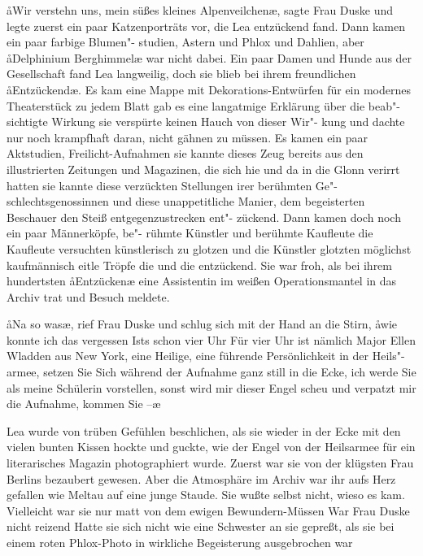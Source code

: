 \aa{}Wir verstehn uns, mein süßes kleines Alpenveilchen\ae{}, sagte
Frau Duske und legte zuerst ein paar Katzenporträts vor, die
Lea entzückend fand. Dann kamen ein paar farbige Blumen"-%
studien, Astern und Phlox und Dahlien, aber \aa{}Delphinium
Berghimmel\ae{} war nicht dabei. Ein paar Damen und Hunde
aus der Gesellschaft fand Lea langweilig, doch sie blieb bei
ihrem freundlichen \aa{}Entzückend\ae{}. Es kam eine Mappe mit
Dekorations-Entwürfen für ein modernes Theaterstück\semi{} zu
jedem Blatt gab es eine langatmige Erklärung über die beab"-%
sichtigte Wirkung\semi{} sie verspürte keinen Hauch von dieser Wir"-%
kung und dachte nur noch krampfhaft daran, nicht gähnen zu
müssen. Es kamen ein paar Aktstudien, Freilicht-Aufnahmen\semi{}
sie kannte dieses Zeug bereits aus den illustrierten Zeitungen
und Magazinen, die sich hie und da in die Glonn verirrt hatten\semi{}
sie kannte diese verzückten Stellungen irer berühmten Ge"-%
schlechtsgenossinnen und diese unappetitliche Manier, dem
begeisterten Beschauer den Steiß entgegenzustrecken\dopp{} ent"-%
zückend. Dann kamen doch noch ein paar Männerköpfe, be"-%
rühmte Künstler und berühmte Kaufleute\semi{} die Kaufleute
versuchten künstlerisch zu glotzen und die Künstler glotzten
möglichst kaufmännisch\semi{} eitle Tröpfe die und die\dopp{} entzückend.
Sie war froh, als bei ihrem hundertsten \aa{}Entzücken\ae{} eine
Assistentin im weißen Operationsmantel in das Archiv trat
und Besuch meldete.

\aa{}Na so was\ae{}, rief Frau Duske und schlug sich mit der Hand an
die Stirn, \aa{}wie konnte ich das vergessen\ausr{} Ists schon vier Uhr\frag{}
Für vier Uhr ist nämlich Major Ellen Wladden aus New
York, eine Heilige, eine führende Persönlichkeit in der Heils"-%
armee, setzen Sie Sich\eingriff{eS62-1}{Sich ] sich} während der Aufnahme ganz still in die
Ecke, ich werde Sie als meine Schülerin vorstellen, sonst
wird mir dieser Engel scheu und verpatzt mir die Aufnahme,
kommen Sie --\ae{}

Lea wurde von trüben Gefühlen beschlichen, als sie wieder
in der Ecke mit den vielen bunten Kissen hockte und guckte,
wie der Engel von der Heilsarmee für ein literarisches Magazin
photographiert wurde. Zuerst war sie von der klügsten Frau
Berlins bezaubert gewesen. Aber die Atmosphäre im Archiv
war ihr aufs Herz gefallen wie Meltau\label{lS63-1} auf eine junge Staude.
Sie wußte selbst nicht, wieso es kam. Vielleicht war sie nur
matt von dem ewigen Bewundern-Müssen\frag{} War Frau Duske
nicht reizend\frag{} Hatte sie sich nicht wie eine Schwester an sie
gepreßt, als sie bei einem roten Phlox-Photo\label{lS63-2} in wirkliche
Begeisterung ausgebrochen war\frag{}

